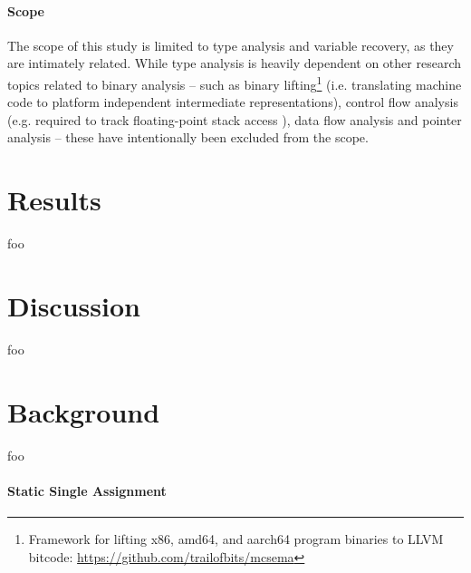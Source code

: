 \documentclass[10pt, a4paper, sigplan, authordraft]{acmart}
\begin{document}
\paragraph{Scope} The scope of this study is limited to type analysis and variable recovery, as they are intimately related. While type analysis is heavily dependent on other research topics related to binary analysis -- such as binary lifting\footnote{Framework for lifting x86, amd64, and aarch64 program binaries to LLVM bitcode: \url{https://github.com/trailofbits/mcsema}} (i.e. translating machine code to platform independent intermediate representations), control flow analysis (e.g. required to track floating-point stack access \cite{tie_reverse_engineering_of_types}), data flow analysis and pointer analysis -- these have intentionally been excluded from the scope.





\section{Results}

foo


\section{Discussion}

foo



\section{Background}

foo

\paragraph{Static Single Assignment}
\end{document}
